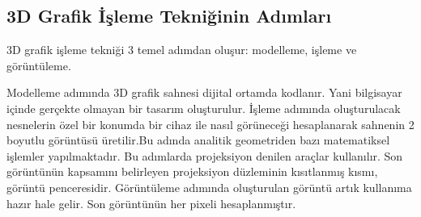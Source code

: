 \documentclass[12pt]{article}\usepackage[utf8]{inputenc}
\begin{document}
	\subsection{3D Grafik İşleme Tekniğinin Adımları}

3D grafik işleme tekniği 3 temel adımdan oluşur: modelleme, işleme ve görüntüleme.

 Modelleme adımında 3D grafik sahnesi dijital ortamda kodlanır. Yani bilgisayar içinde gerçekte olmayan bir tasarım oluşturulur.
İşleme adımında oluşturulacak nesnelerin özel bir konumda bir cihaz ile nasıl görüneceği hesaplanarak sahnenin 2 boyutlu görüntüsü üretilir.Bu adında analitik geometriden bazı matematiksel işlemler yapılmaktadır.
Bu adımlarda projeksiyon denilen araçlar kullanılır.
Son görüntünün kapsamını belirleyen projeksiyon düzleminin kısıtlanmış kısmı, görüntü penceresidir.
Görüntüleme adımında oluşturulan görüntü artık kullanıma hazır hale gelir. Son görüntünün her pixeli hesaplanmıştır.
\end{document}
